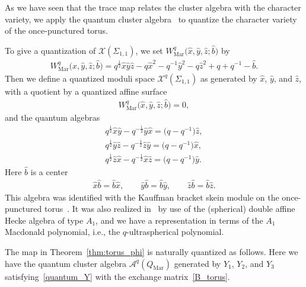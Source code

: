 \documentclass[pdftex]{sigma}
\numberwithin{equation}{section}
\begin{document}
As we have seen that the trace map relates the cluster algebra with the character variety, we apply the quantum cluster algebra~\cite{BerenZelev05a,FockGonc09a} to quantize the character variety of the once-punctured torus.

To give a quantization of $\mathcal{X}(\Sigma_{1,1})$, we set $W_{\text{Mar}}^q\big(\hat{x},\hat{y},\hat{z}; \hat{b}\big)$ by
\begin{gather*}
 W_{\text{Mar}}^q\big(\hat{x},\hat{y},\hat{z}; \hat{b}\big) = q^{\frac{1}{2}} \hat{x} \hat{y} \hat{z} - q {\hat{x}}^2 - q^{-1} {\hat{y}}^2 - q {\hat{z}}^2 + q+q^{-1} - \hat{b} .
\end{gather*}
Then we define a quantized moduli space $\mathcal{X}^q(\Sigma_{1,1})$ as generated by $\hat{x}$, $\hat{y}$, and $\hat{z}$, with a quotient by a quantized affine surface
\begin{gather*}
 W_{\text{Mar}}^q\big(\hat{x}, \hat{y}, \hat{z}; \hat{b}\big)=0 ,
\end{gather*}
and the quantum algebras
 \begin{gather*}
 q^{\frac{1}{2}} \hat{x} \hat{y} - q^{-\frac{1}{2}} \hat{y} \hat{x} = \big( q-q^{-1} \big) \hat{z} , \\
 q^{\frac{1}{2}} \hat{y} \hat{z} - q^{-\frac{1}{2}} \hat{z} \hat{y} = \big( q-q^{-1} \big) \hat{x} , \\
 q^{\frac{1}{2}} \hat{z} \hat{x} - q^{-\frac{1}{2}} \hat{x} \hat{z} = \big( q-q^{-1} \big) \hat{y} .
\end{gather*}
Here $\hat{b}$ is a center
\begin{gather*}
 \hat{x} \hat{b} = \hat{b} \hat{x} , \qquad \hat{y} \hat{b} = \hat{b} \hat{y} , \qquad \hat{z} \hat{b} = \hat{b} \hat{z} .
\end{gather*}
This algebra was identified with the Kauffman bracket skein module on the once-punctured torus~\cite{BulloPrzyt99a}. It was also realized in~\cite{Oblom04a} by use of the (spherical) double affine Hecke algebra of type $A_1$, and we have a representation in terms of the $A_1$ Macdonald polynomial, i.e., the $q$-ultraspherical polynomial.

The map in Theorem~\ref{thm:torus_phi} is naturally quantized as follows. Here we have the quantum cluster algebra $\mathcal{A}^q(Q_{\text{Mar}})$ generated by $Y_1$, $Y_2$, and $Y_3$ satisfying~\eqref{quantum_Y} with the exchange matrix~\eqref{B_torus}.
\end{document}
